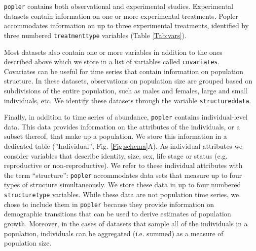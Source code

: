 \documentclass{article}\usepackage[]{graphicx}\usepackage[]{color}
\begin{document}
\texttt{popler} contains both observational and experimental studies. Experimental datasets contain information on one or more experimental treatments. Popler accommodates information on up to three experimental treatments, identified by three numbered \texttt{treatment\textunderscore type} variables (Table \ref{Tab:vars}). 

Most datasets also contain one or more variables in addition to the ones described above which we store in a list of variables called \texttt{covariates}. Covariates can be useful for time series that contain information on population structure. In these datasets, observations on population size are grouped based on subdivisions of the entire population, such as males and females, large and small individuals, etc. We identify these datasets through the variable \texttt{structured\textunderscore data}.

Finally, in addition to time series of abundance, \texttt{popler} contains individual-level data. This data provides information on the attributes of the individuals, or a subset thereof, that make up a population. We store this information in a dedicated table (''Individual'', Fig. \ref{Fig:schema}A). As individual attributes we consider variables that describe identity, size, sex, life stage or status (e.g. reproductive or non-reproductive). We refer to these individual attributes with the term ``structure'': \texttt{popler} accommodates data sets that measure up to four types of structure simultaneously. We store these data in up to four numbered \texttt{structure\textunderscore type} variables. While these data are not population time series, we chose to include them in \texttt{popler} because they provide information on demographic transitions that can be used to derive estimates of population growth. Moreover, in the cases of datasets that sample all of the individuals in a population, individuals can be aggregated (i.e. summed) as a measure of population size.
\end{document}
